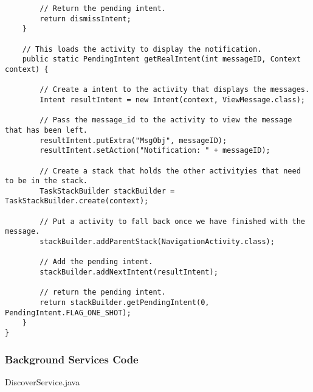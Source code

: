 \begin{lstlisting}
        // Return the pending intent.
        return dismissIntent;
    }

    // This loads the activity to display the notification.
    public static PendingIntent getRealIntent(int messageID, Context context) {

        // Create a intent to the activity that displays the messages.
        Intent resultIntent = new Intent(context, ViewMessage.class);

        // Pass the message_id to the activity to view the message that has been left.
        resultIntent.putExtra("MsgObj", messageID);
        resultIntent.setAction("Notification: " + messageID);

        // Create a stack that holds the other activityies that need to be in the stack.
        TaskStackBuilder stackBuilder = TaskStackBuilder.create(context);

        // Put a activity to fall back once we have finished with the message.
        stackBuilder.addParentStack(NavigationActivity.class);

        // Add the pending intent.
        stackBuilder.addNextIntent(resultIntent);

        // return the pending intent.
        return stackBuilder.getPendingIntent(0, PendingIntent.FLAG_ONE_SHOT);
    }
}

\end{lstlisting}



\subsubsection*{Background Services Code}

DiscoverService.java

